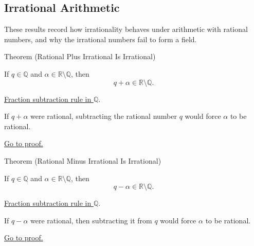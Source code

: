 
\subsection{Irrational Arithmetic}
\label{sec:irrational-arithmetic}

\begin{exposition}
These results record how irrationality behaves under arithmetic with rational
numbers, and why the irrational numbers fail to form a field.
\end{exposition}

\begin{theorembox}{Theorem (Rational Plus Irrational Is Irrational)}
\begin{theorem}
\label{thm:rational-plus-irrational-is-irrational}
If $q\in\mathbb{Q}$ and $\alpha\in\mathbb{R}\setminus\mathbb{Q}$, then
\[
q+\alpha\in\mathbb{R}\setminus\mathbb{Q}.
\]
\end{theorem}
\end{theorembox}
\begin{dependencies}
\hyperref[thm:rational-fraction-subtraction]{Fraction subtraction rule in $\mathbb{Q}$}.
\end{dependencies}
\begin{remark*}
If $q+\alpha$ were rational, subtracting the rational number $q$ would force
$\alpha$ to be rational.
\end{remark*}
\begin{remark*}[Proof]
\hyperref[prf:rational-plus-irrational-is-irrational]{Go to proof.}
\end{remark*}

\begin{theorembox}{Theorem (Rational Minus Irrational Is Irrational)}
\begin{theorem}
\label{thm:rational-minus-irrational-is-irrational}
If $q\in\mathbb{Q}$ and $\alpha\in\mathbb{R}\setminus\mathbb{Q}$, then
\[
q-\alpha\in\mathbb{R}\setminus\mathbb{Q}.
\]
\end{theorem}
\end{theorembox}
\begin{dependencies}
\hyperref[thm:rational-fraction-subtraction]{Fraction subtraction rule in $\mathbb{Q}$}.
\end{dependencies}
\begin{remark*}
If $q-\alpha$ were rational, then subtracting it from $q$ would force
$\alpha$ to be rational.
\end{remark*}
\begin{remark*}[Proof]
\hyperref[prf:rational-minus-irrational-is-irrational]{Go to proof.}
\end{remark*}

